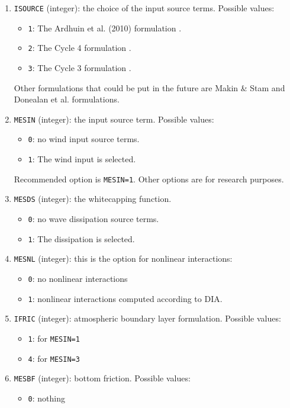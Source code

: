 \documentclass[12pt]{amsart}
\begin{document}
\begin{enumerate}
\item {\tt ISOURCE} (integer): the choice of the input source terms. Possible values:
  \begin{itemize}
  \item {\tt 1}: The Ardhuin et al. (2010) formulation \cite{ArdhuinSurfaceStressFormulation}.
  \item {\tt 2}: The Cycle 4 formulation \cite{CycleIV}.
  \item {\tt 3}: The Cycle 3 formulation \cite{WAMDIgroup}.
  \end{itemize}
Other formulations that could be put in the future are Makin \& Stam \cite{MakinStam} and Donealan et al. formulations.
\item {\tt MESIN} (integer): the input source term. Possible values:
  \begin{itemize}
  \item {\tt 0}: no wind input source terms.
  \item {\tt 1}: The wind input is selected.
  \end{itemize}
Recommended option is {\tt MESIN=1}. Other options are for research purposes.
\item {\tt MESDS} (integer): the whitecapping function.
  \begin{itemize}
  \item {\tt 0}: no wave dissipation source terms.
  \item {\tt 1}: The dissipation is selected.
  \end{itemize}
\item {\tt MESNL} (integer): this is the option for nonlinear interactions:
  \begin{itemize}
  \item {\tt 0}: no nonlinear interactions
  \item {\tt 1}: nonlinear interactions computed according to DIA.
  \end{itemize}
\item {\tt IFRIC} (integer): atmospheric boundary layer formulation. Possible values:
  \begin{itemize}
  \item {\tt 1}: for {\tt MESIN=1}
  \item {\tt 4}: for {\tt MESIN=3}
  \end{itemize}
\item {\tt MESBF} (integer): bottom friction. Possible values:
  \begin{itemize}
  \item {\tt 0}: nothing

\end{itemize}
\end{enumerate}
\end{document}
